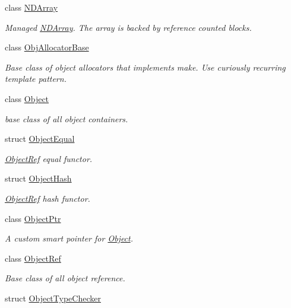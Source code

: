 \begin{DoxyCompactItemize}
class \hyperlink{classtvm_1_1runtime_1_1NDArray}{N\+D\+Array}
\begin{DoxyCompactList}\small\item\em Managed \hyperlink{classtvm_1_1runtime_1_1NDArray}{N\+D\+Array}. The array is backed by reference counted blocks. \end{DoxyCompactList}\item 
class \hyperlink{classtvm_1_1runtime_1_1ObjAllocatorBase}{Obj\+Allocator\+Base}
\begin{DoxyCompactList}\small\item\em Base class of object allocators that implements make. Use curiously recurring template pattern. \end{DoxyCompactList}\item 
class \hyperlink{classtvm_1_1runtime_1_1Object}{Object}
\begin{DoxyCompactList}\small\item\em base class of all object containers. \end{DoxyCompactList}\item 
struct \hyperlink{structtvm_1_1runtime_1_1ObjectEqual}{Object\+Equal}
\begin{DoxyCompactList}\small\item\em \hyperlink{classtvm_1_1runtime_1_1ObjectRef}{Object\+Ref} equal functor. \end{DoxyCompactList}\item 
struct \hyperlink{structtvm_1_1runtime_1_1ObjectHash}{Object\+Hash}
\begin{DoxyCompactList}\small\item\em \hyperlink{classtvm_1_1runtime_1_1ObjectRef}{Object\+Ref} hash functor. \end{DoxyCompactList}\item 
class \hyperlink{classtvm_1_1runtime_1_1ObjectPtr}{Object\+Ptr}
\begin{DoxyCompactList}\small\item\em A custom smart pointer for \hyperlink{classtvm_1_1runtime_1_1Object}{Object}. \end{DoxyCompactList}\item 
class \hyperlink{classtvm_1_1runtime_1_1ObjectRef}{Object\+Ref}
\begin{DoxyCompactList}\small\item\em Base class of all object reference. \end{DoxyCompactList}\item 
struct \hyperlink{structtvm_1_1runtime_1_1ObjectTypeChecker}{Object\+Type\+Checker}

\end{DoxyCompactItemize}
